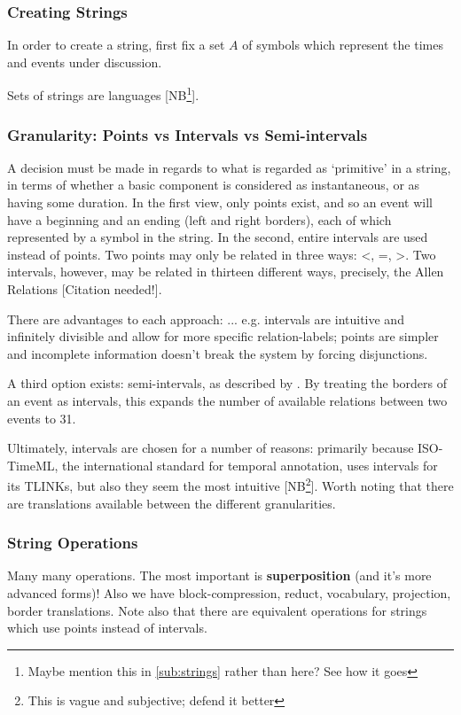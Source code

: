 \documentclass[a4paper,12pt,leqno]{article}
\newcommand{\citeneeded}[1][]{{\color{red}[Citation needed!#1]}}
\newcommand{\selfnote}[1]{{\color{red}[NB\footnote{{\color{red}#1}}]}}
\begin{document}
\subsubsection{Creating Strings}\label{ssub:creating}
In order to create a string, first fix a set $A$ of symbols which represent the times and events under discussion. 

Sets of strings are languages \selfnote{Maybe mention this in \ref{sub:strings} rather than here? See how it goes}.

\subsubsection{Granularity: Points vs Intervals vs Semi-intervals}\label{ssub:granularity}
A decision must be made in regards to what is regarded as `primitive' in a string, in terms of whether a basic component is considered as instantaneous, or as having some duration. In the first view, only points exist, and so an event will have a beginning and an ending (left and right borders), each of which represented by a symbol in the string. In the second, entire intervals are used instead of points. Two points may only be related in three ways: \textless, =, \textgreater. Two intervals, however, may be related in thirteen different ways, precisely, the Allen Relations \citeneeded{}. 

There are advantages to each approach: ... e.g. intervals are intuitive and infinitely divisible and allow for more specific relation-labels; points are simpler and incomplete information doesn't break the system by forcing disjunctions.

A third option exists: semi-intervals, as described by \cite{Freksa1992}. By treating the borders of an event as intervals, this expands the number of available relations between two events to 31.

Ultimately, intervals are chosen for a number of reasons: primarily because ISO-TimeML, the international standard for temporal annotation, uses intervals for its TLINKs, but also they seem the most intuitive \selfnote{This is vague and subjective; defend it better}. Worth noting that there are translations available between the different granularities.

\subsubsection{String Operations}\label{ssub:operations}
Many many operations. The most important is \textbf{superposition} (and it's more advanced forms)! Also we have block-compression, reduct, vocabulary, projection, border translations. Note also that there are equivalent operations for strings which use points instead of intervals.
\end{document}
